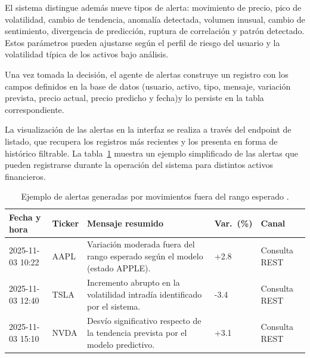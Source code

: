   El sistema distingue además nueve tipos de alerta: movimiento  
  de precio, pico de volatilidad, cambio de tendencia, anomalía detectada, volumen inusual,   
  cambio de sentimiento, divergencia de predicción, ruptura de correlación y patrón detectado.   Estos parámetros pueden ajustarse según el perfil de riesgo del usuario y la volatilidad   
  típica de los activos bajo análisis.
  
Una vez tomada la decisión, el agente de alertas construye un registro con los campos definidos en la base de datos    
  (usuario, activo, tipo, mensaje, variación prevista, precio actual, precio predicho y       
  fecha)y lo persiste en la tabla correspondiente.
  
  La
visualización de las alertas en la interfaz se realiza a través del endpoint de
listado, que recupera los registros más recientes y los presenta en forma de
histórico filtrable. La tabla~\ref{tab:alertas} muestra un ejemplo
simplificado de las alertas que pueden registrarse durante la operación del
sistema para distintos activos financieros.


\begin{table}[H]
\centering
\renewcommand{\arraystretch}{1.15}

\caption{Ejemplo de alertas generadas por movimientos fuera del rango esperado .}
\label{tab:alertas}

\begin{tabularx}{0.98\textwidth}{
    p{2.9cm}   %
    p{1.4cm}   %
    X          %
    p{1.2cm}   %
    p{2.2cm}   %
}
\toprule
\textbf{Fecha y hora} & \textbf{Ticker} &
\textbf{Mensaje resumido} &
\textbf{Var.\ (\%)} & \textbf{Canal} \\
\midrule

2025-11-03 10:22 & AAPL &
Variación moderada fuera del rango esperado según el modelo (estado APPLE). &
+2.8 & Consulta REST\\

2025-11-03 12:40 & TSLA &
Incremento abrupto en la volatilidad intradía identificado por el sistema. &
-3.4 & Consulta REST \\

2025-11-03 15:10 & NVDA &
Desvío significativo respecto de la tendencia prevista por el modelo predictivo. &
+3.1 & Consulta REST \\

\bottomrule
\end{tabularx}

\end{table}

